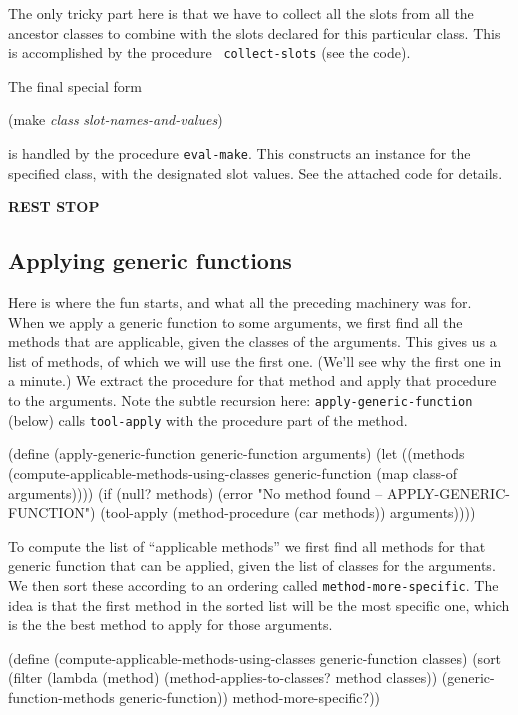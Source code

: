 The only tricky part here is that we have to collect all the slots from
all the ancestor classes to combine with the slots declared for this
particular class.  This is accomplished by the procedure {\tt
collect-slots} (see the code).

The final special form

\beginlisp
(make {\it class} {\it slot-names-and-values})
\endlisp

\noindent is handled by the procedure {\tt eval-make}.  This
constructs an instance for the specified class, with the designated slot
values.  See the attached code for details.

\smallskip
\begin{center}
{\bf REST STOP}
\end{center}
\smallskip

\subsection{Applying generic functions}

Here is where the fun starts, and what all the preceding machinery was
for.  When we apply a generic function to some arguments, we first
find all the methods that are applicable, given the classes of the
arguments.  This gives us a list of methods, of which we will use the
first one.  (We'll see why the first one in a minute.)  We extract the
procedure for that method and apply that procedure to the arguments.
Note the subtle recursion here: {\tt apply-generic-function} (below)
calls {\tt tool-apply} with the procedure part of the method.

\beginlisp
(define (apply-generic-function generic-function arguments)
  (let ((methods (compute-applicable-methods-using-classes
                  generic-function
                  (map class-of arguments)))) 
    (if (null? methods)
        (error "No method found -- APPLY-GENERIC-FUNCTION")
        (tool-apply (method-procedure (car methods)) arguments))))
\endlisp


To compute the list of ``applicable methods'' we first find all
methods for that generic function that can be applied, given the list
of classes for the arguments.  We then sort these according to an
ordering called {\tt method-more-specific}.  The idea is that the
first method in the sorted list will be the most specific one, which
is the the best method to apply for those arguments.

\beginlisp
(define (compute-applicable-methods-using-classes generic-function classes)
  (sort
   (filter
    (lambda (method)
      (method-applies-to-classes? method classes))
    (generic-function-methods generic-function))
   method-more-specific?))
\endlisp

